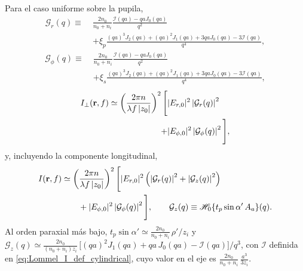 Para el caso uniforme sobre la pupila,
\begin{equation}
\begin{aligned}
\mathcal G_r(q)
\equiv\;&
\frac{2n_0}{n_0+n_i}
\frac{\mathcal I(qa)-qaJ_0(qa)}{q^2}
\\[0.3em]
&+
\xi_p
\frac{
(qa)^3J_2(qa)
+
(qa)^2J_1(qa)
+
3qaJ_0(qa)
-
3\mathcal I(qa)
}{q^4},
\end{aligned}
\label{eq:Gr_cylindrical}
\end{equation}
\begin{equation}
\begin{aligned}
\mathcal G_\phi(q)
\equiv\;&
\frac{2n_0}{n_0+n_i}
\frac{\mathcal I(qa)-qaJ_0(qa)}{q^2}
\\[0.3em]
&+
\xi_s
\frac{
(qa)^3J_2(qa)
+
(qa)^2J_1(qa)
+
3qaJ_0(qa)
-
3\mathcal I(qa)
}{q^4},
\end{aligned}
\label{eq:Gphi_cylindrical}
\end{equation}
\begin{equation}
\begin{aligned}
  I_\perp(\vb r,f)
  \simeq
  \left(
  \frac{2\pi n}{\lambda f\,|z_0|}
  \right)^2
  \Bigg[
  &
  |E_{r,0}|^2
  \left|
  \mathcal G_r(q)
  \right|^2
  \\
  +
  &
  |E_{\phi,0}|^2
  \left|
  \mathcal G_\phi(q)
  \right|^2
  \Bigg],
\end{aligned}
\label{eq:I_perp_cylindrical_homogeneous}
\end{equation}
y, incluyendo la componente longitudinal,
\begin{equation}
\begin{aligned}
I(\vb r,f)
&\simeq
\left(
\frac{2\pi n}{\lambda f\,|z_0|}
\right)^2
\Bigg[
|E_{r,0}|^2
\left(
\left|
\mathcal G_r(q)
\right|^2
+
\left|
\mathcal G_z(q)
\right|^2
\right)
\\
&\qquad
+
|E_{\phi,0}|^2
\left|
\mathcal G_\phi(q)
\right|^2
\Bigg],
\qquad
\mathcal G_z(q)\equiv\mathscr H_0\{t_p\sin\alpha'\,A_a\}(q).
\end{aligned}
\label{eq:I_total_cylindrical_homogeneous}
\end{equation}
Al orden paraxial más bajo, $t_p\sin\alpha'\simeq \tfrac{2n_0}{n_0+n_i}\,\rho'/z_i$ y $\mathcal G_z(q)\simeq\tfrac{2n_0}{(n_0+n_i)z_i}\,\big[(qa)^2J_1(qa)+qa\,J_0(qa)-\mathcal I(qa)\big]/q^3$, con $\mathcal I$ definida en \eqref{eq:Lommel_I_def_cylindrical}, cuyo valor en el eje es $\tfrac{2n_0}{n_0+n_i}\,\tfrac{a^3}{3z_i}$.


